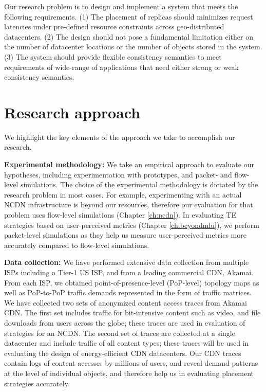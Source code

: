 Our research problem is to design and implement a system that meets the following requirements.
(1) The placement of replicas should minimizes request latencies under pre-defined resource constraints across geo-distributed datacenters.
(2) The design should not pose a fundamental limitation either on the number of datacenter locations or the number of objects stored in the system.
(3) The system should provide flexible consistency semantics to meet requirements of wide-range of applications that need either strong or weak consistency semantics.

\section{Research approach}
We highlight the key elements of the approach we take to accomplish our research.

\textbf{Experimental methodology:} We take an empirical approach to evaluate our hypotheses, including experimentation with prototypes, and  packet- and flow-level simulations. 
The choice of the experimental methodology is dictated by the research problem in most cases. For example, experimenting with an actual NCDN infrastructure is beyond our resources, therefore our evaluation for that problem uses flow-level simulations (Chapter \ref{ch:ncdn}). 
In evaluating TE strategies based on user-perceived metrics (Chapter \ref{ch:beyondmlu}), we  perform packet-level simulations as they help us measure user-perceived metrics more accurately compared to flow-level simulations.

\textbf{Data collection:} We have performed extensive data collection from multiple ISPs including a Tier-1 US ISP, and from a leading commercial CDN, Akamai. From each ISP, we obtained point-of-presence-level (PoP-level) topology maps as well as PoP-to-PoP traffic demands represented in the form of traffic matrices. We have collected two sets of anonymized content access traces from Akamai CDN. The first set includes traffic for bit-intensive content such as video, and file downloads from users across the globe; these traces are used in evaluation of strategies for an NCDN. The second set of traces are collected at a single datacenter and include traffic of all content types; these traces will be used in evaluating the design of energy-efficient CDN datacenters. Our CDN traces contain logs of content accesses by millions of users, and reveal demand patterns at the level of individual objects, and therefore help us in evaluating placement strategies accurately.

